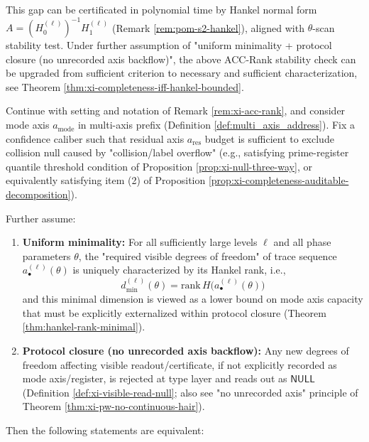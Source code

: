 \begin{remark}
This gap can be certificated in polynomial time by Hankel normal form \(A=(H_0^{(\ell)})^{-1}H_1^{(\ell)}\) (Remark \ref{rem:pom-s2-hankel}), aligned with \(\theta\)-scan stability test.
Under further assumption of "uniform minimality + protocol closure (no unrecorded axis backflow)", the above ACC-Rank stability check can be upgraded from sufficient criterion to necessary and sufficient characterization, see Theorem \ref{thm:xi-completeness-iff-hankel-bounded}.
\end{remark}

\begin{theorem}\label{thm:xi-completeness-iff-hankel-bounded}
Continue with setting and notation of Remark \ref{rem:xi-acc-rank}, and consider mode axis \(a_{\mathrm{mode}}\) in multi-axis prefix (Definition \ref{def:multi_axis_address}).
Fix a confidence caliber such that residual axis \(a_{\mathrm{res}}\) budget is sufficient to exclude collision null caused by "collision/label overflow" (e.g., satisfying prime-register quantile threshold condition of Proposition \ref{prop:xi-null-three-way}, or equivalently satisfying item (2) of Proposition \ref{prop:xi-completeness-auditable-decomposition}).
\par
Further assume:
\begin{enumerate}
  \item \textbf{Uniform minimality:} For all sufficiently large levels \(\ell\) and all phase parameters \(\theta\), the "required visible degrees of freedom" of trace sequence \(a^{(\ell)}_\bullet(\theta)\) is uniquely characterized by its Hankel rank, i.e.,
  \[
  d^{(\ell)}_{\min}(\theta)=\mathrm{rank}\,H\!\bigl(a^{(\ell)}_\bullet(\theta)\bigr)
  \]
  and this minimal dimension is viewed as a lower bound on mode axis capacity that must be explicitly externalized within protocol closure (Theorem \ref{thm:hankel-rank-minimal}).
  \item \textbf{Protocol closure (no unrecorded axis backflow):} Any new degrees of freedom affecting visible readout/certificate, if not explicitly recorded as mode axis/register, is rejected at type layer and reads out as \(\mathsf{NULL}\) (Definition \ref{def:xi-visible-read-null}; also see "no unrecorded axis" principle of Theorem \ref{thm:xi-pw-no-continuous-hair}).
\end{enumerate}
Then the following statements are equivalent:
\begin{enumerate}

\end{enumerate}
\end{theorem}
